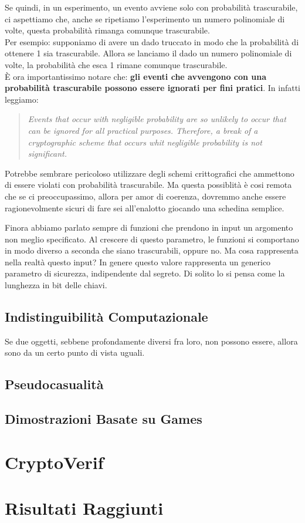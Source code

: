 \documentclass[a4paper,openright,twoside,12pt]{report}
\begin{document}
Se quindi, in un esperimento, un evento avviene solo con probabilit\`a trascurabile, ci aspettiamo che, anche se ripetiamo l'esperimento un numero polinomiale di volte, questa probabilit\`a
rimanga comunque trascurabile.\\
Per esempio: supponiamo di avere un dado truccato in modo che la probabilit\`a di ottenere 1 sia trascurabile. Allora se lanciamo il dado un numero polinomiale di volte, la probabilit\`a
che esca 1 rimane comunque trascurabile.\\
\`E ora importantissimo notare che:
\textbf{gli eventi che avvengono con una probabilit\`a trascurabile possono essere ignorati per fini pratici}.
In \cite{1206501} infatti leggiamo:
\begin{quotation}
\emph{Events that occur with negligible probability are so unlikely to occur that can be ignored for all practical purposes. Therefore,
a break of a cryptographic scheme that occurs whit negligible probability is not significant.}
\end{quotation}
Potrebbe sembrare pericoloso utilizzare degli schemi crittografici che ammettono di essere violati con probabilit\`a trascurabile. 
Ma questa possiblit\`a \`e cosi remota che se ci preoccupassimo, allora per amor di coerenza, dovremmo anche essere ragionevolmente sicuri di 
fare sei all'enalotto giocando una schedina semplice.



Finora abbiamo parlato sempre di funzioni che prendono in input un argomento non meglio specificato. Al crescere di questo parametro, le funzioni si comportano in modo diverso a seconda che siano trascurabili, oppure no.
Ma cosa rappresenta nella realt\`a questo input?
In genere questo valore rappresenta un generico parametro di sicurezza, indipendente dal segreto. Di solito lo si pensa come la lunghezza in bit delle chiavi.


\newpage

\section{Indistinguibilit\`a Computazionale}
Se due oggetti, sebbene profondamente diversi fra loro, non possono essere, allora sono da un certo punto di vista uguali.

\section{Pseudocasualit\`a}

\section{Dimostrazioni Basate su Games}

\chapter{CryptoVerif}

\chapter{Risultati Raggiunti}

\lhead[\fancyplain{}{\bfseries\thepage}]{\fancyplain{}{\bfseries\rightmark}}
	
		
\end{document}
